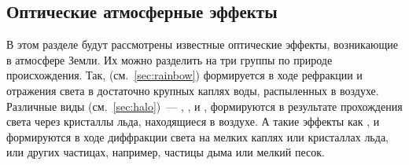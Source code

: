 \subsection{Оптические атмосферные эффекты}

В этом разделе будут рассмотрены известные оптические эффекты, возникающие в атмосфере Земли. Их можно разделить на три группы по природе происхождения. Так,  (см.~\ref{sec:rainbow}) формируется в ходе рефракции и отражения света в достаточно крупных каплях воды, распыленных в воздухе. Различные виды  (см.~\ref{sec:halo})~--- , ,  и , формируются в результате прохождения света через кристаллы льда, находящиеся в воздухе. А такие эффекты как ,  и  формируются в ходе  диффракции света на мелких каплях или кристаллах льда, или других частицах, например, частицы дыма или мелкий песок.\,\cite{atmospheric-optics}




